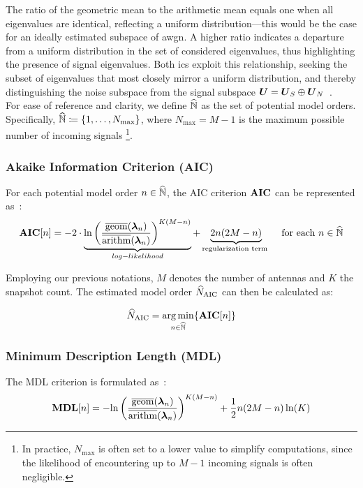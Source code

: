 The ratio of the geometric mean to the arithmetic mean equals one when all eigenvalues are identical, reflecting a
uniform distribution—this would be the case for an ideally estimated subspace of \gls{awgn}.
A higher ratio indicates a departure from a uniform distribution in the set of considered eigenvalues, thus highlighting
the presence of signal eigenvalues. Both \glspl{ic} exploit this relationship, seeking the subset of
eigenvalues that most closely mirror a uniform distribution, and thereby distinguishing the noise subspace
from the signal subspace \( \boldsymbol{U} = \boldsymbol{U}_S \oplus \boldsymbol{U}_N \)~\cite{meyer}.\\
For ease of reference and clarity, we define \( \widehat{\mathbb{N}} \) as the set of potential model orders. Specifically,
\( \widehat{\mathbb{N}} \coloneqq \{1, \ldots, N_{\max}\} \), where \( N_{\max} = M - 1\) is the maximum possible number of incoming signals%
\footnote{
In practice, \( N_{\max} \) is often set to a lower value to simplify computations, since the likelihood of encountering
up to \( M - 1 \) incoming signals is often negligible.
}.\\

\subsubsection{Akaike Information Criterion (AIC)}

For each potential model order \(n \in \widehat{\mathbb{N}} \), the AIC criterion \( \boldsymbol{\mathrm{AIC}} \) can be represented as~\cite{mdlAndAic}:
\begin{equation}
    \boldsymbol{\mathrm{AIC}}[n] = - 2 \cdot \underbrace{{\ln \left(\frac{\overline{\operatorname{geom}}(\boldsymbol{\lambda}_n)}{\overline{\operatorname{arithm}}(\boldsymbol{\lambda}_n)}\right)}^{K(M - n)}}_{log-likelihood} + \underbrace{2n(2M - n)}_{\text {regularization term }} \quad \text{for each } n \in \widehat{\mathbb{N}}
    \label{eq:AIC}
\end{equation}


Employing our previous notations, \( M \) denotes the number of antennas and \( K \) the snapshot count.
The estimated model order \( \widehat{N}_\mathrm{AIC} \) can then be calculated as:

\begin{equation}
    \widehat{N}_\mathrm{AIC}=\underset{n \in \widehat{\mathbb{N}}}{\operatorname*{arg\,min}}\{ \boldsymbol{\mathrm{AIC}}[n] \}
    \label{eq:AIC_argmin}
\end{equation}

\subsubsection{Minimum Description Length (MDL)}
The MDL criterion is formulated as~\cite{mdlAndAic}:
\begin{equation}
    \boldsymbol{\mathrm{MDL}}[n]=  - {\ln \left(\frac{\overline{\operatorname{geom}}(\boldsymbol{\lambda}_n)}{\overline{\operatorname{arithm}}(\boldsymbol{\lambda}_n)}\right)}^{K(M - n)} + \frac{1}{2} n(2 M-n) \ln (K)
    \label{eq:MDL}
\end{equation}

